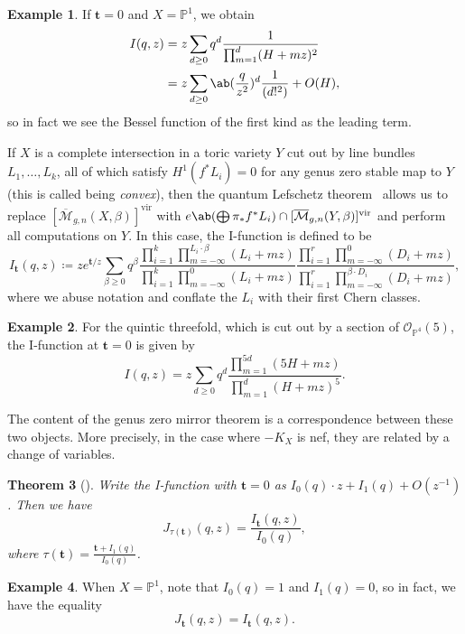 \documentclass{amsart}
\newtheorem{thm}{Theorem}[section]
\theoremstyle{definition}
\newtheorem{exm}[thm]{Example}
\theoremstyle{remark}
\theoremstyle{plain}
\theoremstyle{definition}
\theoremstyle{remark}
\renewcommand{\P}{\mathbb{P}}
\newcommand{\Mbar}{\overline{\mathcal{M}}}
\newcommand{\mc}[1]{\mathcal{#1}}
\newcommand{\mbf}[1]{\mathbf{#1}}
\newcommand{\mr}[1]{\mathrm{#1}}
\newcommand{\1}{\mathbf{1}}
\newcommand{\2}{\mathbf{2}}
\newcommand{\3}{\mathbf{3}}
\newcommand{\vir}{\mr{vir}}
\begin{document}
\begin{exm}
    If \(\mbf{t} = 0\) and \(X = \P^1\), we obtain
    \begin{align*}
        I(q,z) &= z\sum_{d \geq 0} q^d \frac{1}{\prod_{m=1}^d (H + mz)^2} \\
        &= z\sum_{d \geq 0} \ab(\frac{q}{z^2})^d \frac{1}{(d!^2)} + O(H),
    \end{align*}
    so in fact we see the Bessel function of the first kind as the leading term.
\end{exm}

If \(X\) is a complete intersection in a toric variety \(Y\) cut out by line bundles \(L_1, \ldots, L_k\), all of which satisfy \(H^1(f^* L_i) = 0\) for any genus zero stable map to \(Y\) (this is called being \textit{convex}), then the quantum Lefschetz theorem~\cite{CoatesGivental2007} allows us to replace \([\Mbar_{g,n}(X, \beta)]^{\vir}\) with \(e\ab(\bigoplus \pi_* f^* L_i) \cap [\Mbar_{g,n}(Y, \beta)]^{\vir}\) and perform all computations on \(Y\). In this case, the I-function is defined to be
\[
    I_{\mbf{t}}(q,z) \coloneqq z e^{\mbf{t}/z} \sum_{\beta \geq 0} q^{\beta} \frac{\prod_{i=1}^k \prod_{m=-\infty}^{L_i \cdot \beta} (L_i + mz)}{\prod_{i=1}^k \prod_{m=-\infty}^{0} (L_i + mz)} \frac{\prod_{i=1}^r \prod_{m = -\infty}^{0} (D_i + mz)}{\prod_{i=1}^r \prod_{m=-\infty}^{\beta \cdot D_i} (D_i + mz)},
\]
where we abuse notation and conflate the \(L_i\) with their first Chern classes.

\begin{exm}
    For the quintic threefold, which is cut out by a section of \(\mc{O}_{\P^4}(5)\), the I-function at \(\mbf{t} = 0\) is given by
    \[ I(q,z) = z \sum_{d \geq 0} q^d \frac{\prod_{m=1}^{5d}(5H+mz)}{\prod_{m=1}^d (H+mz)^5}. \]
\end{exm}

The content of the genus zero mirror theorem is a correspondence between these two objects. More precisely, in the case where \(-K_X\) is nef, they are related by a change of variables.

\begin{thm}[{\cite{Givental1998,LLY1997}}]
    Write the I-function with \(\mbf{t} = 0\) as \(I_0(q) \cdot z + I_1(q) + O(z^{-1})\). Then we have 
    \[
        J_{\tau(\mbf{t})}(q,z) = \frac{I_{\mbf{t}}(q,z)}{I_0(q)},
    \]
    where \(\tau(\mbf{t}) = \frac{\mbf{t} + I_1(q)}{I_0(q)}\). 
\end{thm}

\begin{exm}
    When \(X = \P^1\), note that \(I_0(q) = 1\) and \(I_1(q) = 0\), so in fact, we have the equality
    \[ J_{\mbf{t}}(q,z) = I_{\mbf{t}}(q,z). \]
\end{exm}
\end{document}
